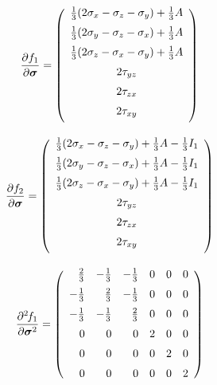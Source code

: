 \begin{eqnarray}
\mbox{$\displaystyle\frac{\partial{f_1}}{\partial{\mbox{\boldmath$\sigma$}}}$} = \left(\begin{array}{c}
\frac{1}{3}(2\sigma_x - \sigma_z - \sigma_y) + \frac{1}{3} A
\\[2mm]
\frac{1}{3}(2\sigma_y - \sigma_z - \sigma_x) + \frac{1}{3} A
\\[2mm]
\frac{1}{3}(2\sigma_z - \sigma_x - \sigma_y) + \frac{1}{3} A
\\[2mm]
2 \tau_{yz}
\\[2mm]
2 \tau_{zx}
\\[2mm]
2 \tau_{xy}
\\[2mm]
\end{array}\right)
\end{eqnarray}

\begin{eqnarray}
\mbox{$\displaystyle\frac{\partial{f_2}}{\partial{\mbox{\boldmath$\sigma$}}}$} = \left(\begin{array}{c}
\frac{1}{3}(2\sigma_x - \sigma_z - \sigma_y) + \frac{1}{3} A - \frac{1}{3} I_1
\\[2mm]
\frac{1}{3}(2\sigma_y - \sigma_z - \sigma_x) + \frac{1}{3} A - \frac{1}{3} I_1
\\[2mm]
\frac{1}{3}(2\sigma_z - \sigma_x - \sigma_y) + \frac{1}{3} A - \frac{1}{3} I_1
\\[2mm]
2 \tau_{yz}
\\[2mm]
2 \tau_{zx}
\\[2mm]
2 \tau_{xy}
\\[2mm]
\end{array}\right)
\end{eqnarray}

\begin{eqnarray}
\mbox{$\displaystyle\frac{\partial^{2}\>\!\!{f_1}}{\partial{\mbox{\boldmath$\sigma$}}^{2}}$} = \left(\begin{array}{rrrrrr}
 \frac{2}{3} & -\frac{1}{3} & -\frac{1}{3} & 0 & 0 & 0
\\[2mm]
-\frac{1}{3} &  \frac{2}{3} & -\frac{1}{3} & 0 & 0 & 0
\\[2mm]
-\frac{1}{3} & -\frac{1}{3} &  \frac{2}{3} & 0 & 0 & 0
\\[2mm]
          0  &           0  &           0  & 2 & 0 & 0
\\[2mm]
          0  &           0  &           0  & 0 & 2 & 0
\\[2mm]
          0  &           0  &           0  & 0 & 0 & 2
\end{array}\right)
\end{eqnarray}

